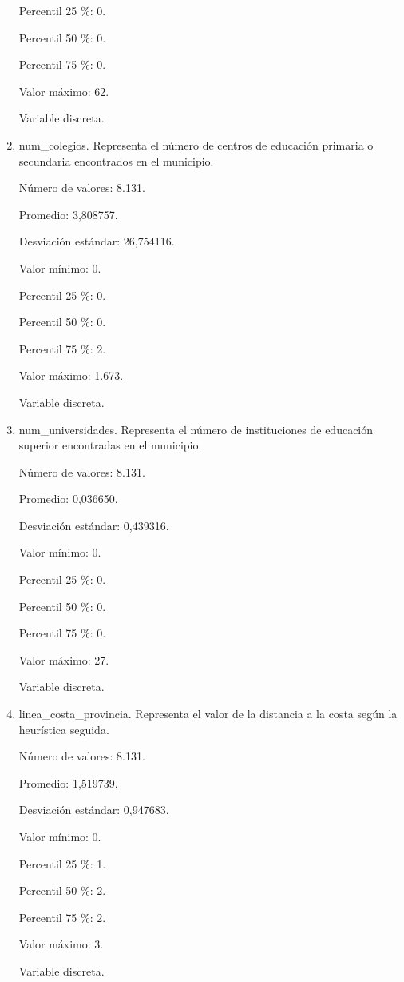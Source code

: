 \begin{enumerate}
	Percentil 25 \%: 0.
	
	Percentil 50 \%: 0.
	
	Percentil 75 \%: 0.
	
	Valor máximo: 62.
	
	Variable discreta.

	\item num\_colegios. Representa el número de centros de educación primaria o secundaria encontrados en el municipio.
	
	Número de valores: 8.131.
	
	Promedio: 3,808757.
	
	Desviación estándar: 26,754116.
	
	Valor mínimo: 0.
	
	Percentil 25 \%: 0.
	
	Percentil 50 \%: 0.
	
	Percentil 75 \%: 2.
	
	Valor máximo: 1.673.
	
	Variable discreta.

	\item num\_universidades. Representa el número de instituciones de educación superior encontradas en el municipio.
	
	Número de valores: 8.131.
	
	Promedio: 0,036650.
	
	Desviación estándar: 0,439316.
	
	Valor mínimo: 0.
	
	Percentil 25 \%: 0.
	
	Percentil 50 \%: 0.
	
	Percentil 75 \%: 0.
	
	Valor máximo: 27.
	
	Variable discreta.

	\item linea\_costa\_provincia. Representa el valor de la distancia a la costa según la heurística seguida.
	
	Número de valores: 8.131.
	
	Promedio: 1,519739.
	
	Desviación estándar: 0,947683.
	
	Valor mínimo: 0.
	
	Percentil 25 \%: 1.
	
	Percentil 50 \%: 2.
	
	Percentil 75 \%: 2.
	
	Valor máximo: 3.
	
	Variable discreta.


\end{enumerate}
